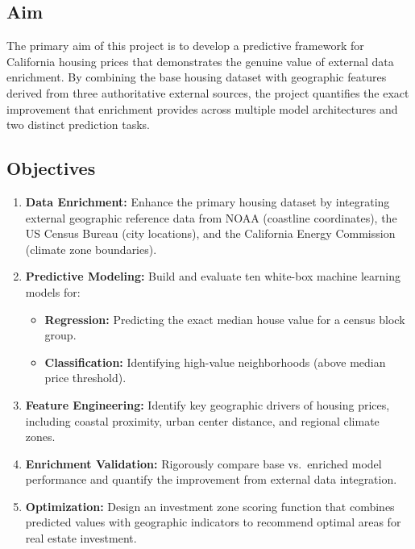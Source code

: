 \documentclass[12pt,a4paper]{article}
\begin{document}
\subsection{Aim}
The primary aim of this project is to develop a predictive framework for California housing prices that demonstrates the genuine value of external data enrichment. By combining the base housing dataset with geographic features derived from three authoritative external sources, the project quantifies the exact improvement that enrichment provides across multiple model architectures and two distinct prediction tasks.

\subsection{Objectives}
\begin{enumerate}
    \item \textbf{Data Enrichment:} Enhance the primary housing dataset by integrating external geographic reference data from NOAA (coastline coordinates), the US Census Bureau (city locations), and the California Energy Commission (climate zone boundaries).
    \item \textbf{Predictive Modeling:} Build and evaluate ten white-box machine learning models for:
    \begin{itemize}
        \item \textbf{Regression:} Predicting the exact median house value for a census block group.
        \item \textbf{Classification:} Identifying high-value neighborhoods (above median price threshold).
    \end{itemize}
    \item \textbf{Feature Engineering:} Identify key geographic drivers of housing prices, including coastal proximity, urban center distance, and regional climate zones.
    \item \textbf{Enrichment Validation:} Rigorously compare base vs.\ enriched model performance and quantify the improvement from external data integration.
    \item \textbf{Optimization:} Design an investment zone scoring function that combines predicted values with geographic indicators to recommend optimal areas for real estate investment.
\end{enumerate}

\newpage

\end{document}
